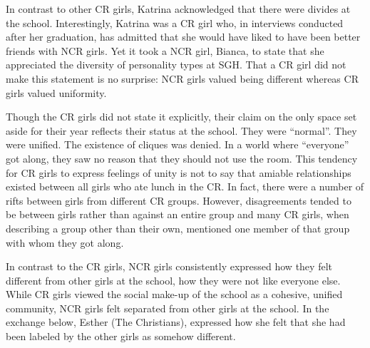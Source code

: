 \vspace{5 mm}

\noindent In contrast to other CR girls, Katrina acknowledged that there were divides at the school. Interestingly, Katrina was a CR girl who, in interviews conducted after her graduation, has admitted that she would have liked to have been better friends with NCR girls.  Yet it took a NCR girl, Bianca, to state that she appreciated the diversity of personality types at SGH. That a CR girl did not make this statement is no surprise: NCR girls valued being different whereas CR girls valued uniformity.

Though the CR girls did not state it explicitly, their claim on the only space set aside for their year reflects their status at the school. They were ``normal''. They were unified. The existence of cliques was denied. In a world where ``everyone'' got along, they saw no reason that they should not use the room. This tendency for CR girls to express feelings of unity is not to say that amiable relationships existed between all girls who ate lunch in the CR. In fact, there were a number of rifts between girls from different CR groups. However, disagreements tended to be between girls rather than against an entire group and many CR girls, when describing a group other than their own, mentioned one member of that group with whom they got along.

\largerpage[-1]
In contrast to the CR girls, NCR girls consistently expressed how they felt different from other girls at the school, how they were not like everyone else. While CR girls viewed the social make-up of the school as a cohesive, unified community, NCR girls felt separated from other girls at the school. In the exchange below, Esther (The Christians), expressed how she felt that she had been labeled by the other girls as somehow different.

\label{ex:labelasdifferent}
  
